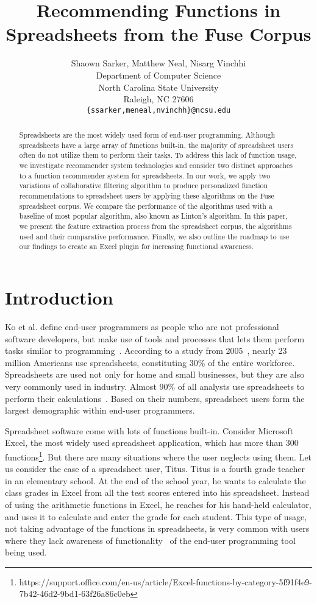 \documentclass{article} %
\title{Recommending Functions in Spreadsheets from the Fuse Corpus}
\author{
Shaown Sarker, Matthew Neal, Nisarg Vinchhi\\
Department of Computer Science\\
North Carolina State University\\
Raleigh, NC 27606 \\
\texttt{\{ssarker,meneal,nvinchh\}@ncsu.edu}
}
\begin{document}
\maketitle

\begin{abstract}
Spreadsheets are the most widely used form of end-user programming. Although spreadsheets have a large array of functions built-in, the majority of spreadsheet users often do not utilize them to perform their tasks. To address this lack of function usage, we investigate recommender system technologies and consider two distinct approaches to a function recommender system for spreadsheets. In our work, we apply two variations of collaborative filtering algorithm to produce personalized function recommendations to spreadsheet users by applying these algorithms on the Fuse spreadsheet corpus. We compare the performance of the algorithms used with a baseline of most popular algorithm, also known as Linton's algorithm. In this paper, we present the feature extraction process from the spreadsheet corpus, the algorithms used and their comparative performance. Finally, we also outline the roadmap to use our findings to create an Excel plugin for increasing functional awareness.
\end{abstract}

\section{Introduction}
Ko et al. define end-user programmers as people who are not professional software developers, but make use of tools and processes that lets them perform tasks similar to programming~\cite{ko2011state}. According to a study from 2005~\cite{scaffidi2005estimating}, nearly 23 million Americans use spreadsheets, constituting 30\% of the entire workforce. Spreadsheets are used not only for home and small businesses, but they are also very commonly used in industry. Almost 90\% of all analysts use spreadsheets to perform their calculations~\cite{winston2001executive}. Based on their numbers, spreadsheet users form the largest demographic within end-user programmers.

Spreadsheet software come with lots of functions built-in. Consider Microsoft Excel, the most widely used spreadsheet application, which has more than 300 functions\footnote{https://support.office.com/en-us/article/Excel-functions-by-category-5f91f4e9-7b42-46d2-9bd1-63f26a86c0eb}. But there are many situations where the user neglects using them. Let us consider the case of a spreadsheet user, Titus. Titus is a fourth grade teacher in an elementary school. At the end of the school year, he wants to calculate the class grades in Excel from all the test scores entered into his spreadsheet. Instead of using the arithmetic functions in Excel, he reaches for his hand-held calculator, and uses it to calculate and enter the grade for each student. This type of usage, not taking advantage of the functions in spreadsheets, is very common with users where they lack awareness of functionality~\cite{grossman2009survey} of the end-user programming tool being used.
\end{document}
